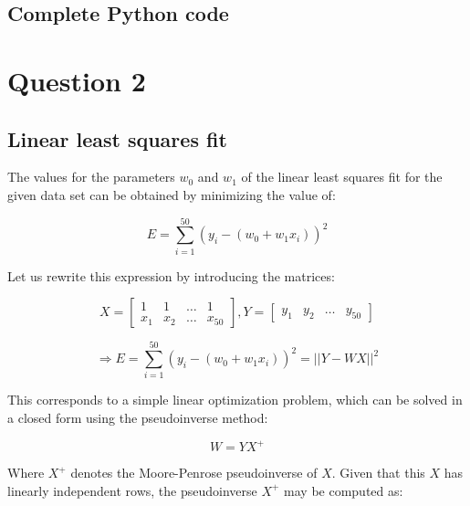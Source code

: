 \documentclass[letterpaper,headings=standardclasses]{scrartcl}
\begin{document}
\subsection{Complete Python code}



\section{Question 2}

\subsection{Linear least squares fit}

The values for the parameters $w_0$ and $w_1$ of the linear least squares fit for the given data set can be obtained by minimizing the value of:

$$ E = \sum_{i = 1}^{50} (y_i - (w_0 + w_1 x_i))^2 $$

Let us rewrite this expression by introducing the matrices:

$$ X = \left[ \begin{matrix} 1 & 1 & \dots & 1 \\ x_1 & x_2 & \dots & x_{50} \end{matrix} \right], Y = \left[ \begin{matrix} y_1 & y_2 & \dots & y_{50} \end{matrix} \right] $$

$$ \Rightarrow E = \sum_{i = 1}^{50} (y_i - (w_0 + w_1 x_i))^2 = || Y - WX ||^2 $$

This corresponds to a simple linear optimization problem, which can be solved in a closed form using the pseudoinverse method:

$$ W = YX^{+} $$

Where $X^{+}$ denotes the Moore-Penrose pseudoinverse of $X$. Given that this $X$ has linearly independent rows, the pseudoinverse $X^{+}$ may be computed as:
\end{document}

